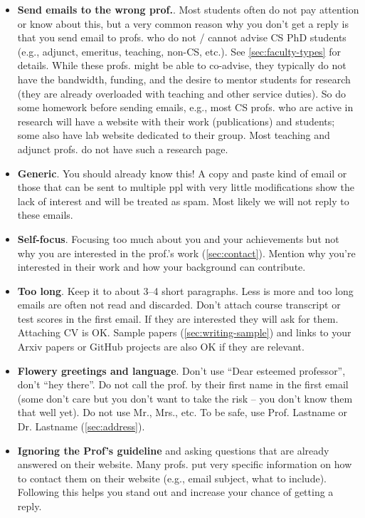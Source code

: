 \documentclass[oneside,11pt,dvipsnames]{book}
\begin{document}
\begin{itemize}
    \item \textbf{Send emails to the wrong prof.}. Most students often do not pay attention or know about this, but a very common reason why you don't get a reply is that you send email to profs. who do not / cannot advise CS PhD students (e.g., adjunct, emeritus, teaching, non-CS, etc.). See \autoref{sec:faculty-types} for details. While these profs. might be able to co-advise, they typically do not have the bandwidth, funding, and the desire to mentor students for research (they are already overloaded with teaching and other service duties). So do some homework before sending emails, e.g., most CS profs. who are active in research will have a website with their work (publications) and students; some also have lab website dedicated to their group. Most teaching and adjunct profs. do not have such a research page.
        
    \item \textbf{Generic}. You should already know this! A copy and paste kind of email or those that can be sent to multiple ppl with very little modifications show the lack of interest and will be treated as spam. Most likely we will not reply to these emails. 

    \item \textbf{Self-focus}. Focusing too much about you and your achievements but not why you are interested in the prof.'s work (\autoref{sec:contact}). Mention why you're interested in their work and how your background can contribute. 

    \item \textbf{Too long}. Keep it to about 3--4 short paragraphs. Less is more and too long emails are often not read and discarded. Don't attach course transcript or test scores in the first email. If they are  interested they will ask for them.  Attaching CV is OK. Sample papers (\autoref{sec:writing-sample}) and links to your Arxiv papers or GitHub projects are also OK if they are relevant.
    
    \item \textbf{Flowery greetings and language}. Don't use ``Dear esteemed professor'', don't ``hey there''.  Do not call the prof. by their first name in the first email (some don't care but you don't want to take the risk -- you don't know them that well yet).  Do not use Mr., Mrs., etc. To be safe, use Prof. Lastname or Dr. Lastname (\autoref{sec:address}).
    
    \item \textbf{Ignoring the Prof's guideline} and asking questions that are already answered on their website.  Many profs. put very specific information on how to contact them on their website (e.g., email subject, what to include).  Following this helps you stand out and increase your chance of getting a reply.
    

\end{itemize}
\end{document}
